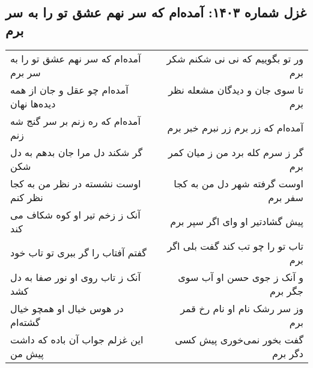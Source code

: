 \begin{center}
\section*{غزل شماره ۱۴۰۳: آمده‌ام که سر نهم عشق تو را به سر برم}
\label{sec:1403}
\begin{longtable}{l p{0.5cm} r}
آمده‌ام که سر نهم عشق تو را به سر برم
&&
ور تو بگوییم که نی نی شکنم شکر برم
\\
آمده‌ام چو عقل و جان از همه دیده‌ها نهان
&&
تا سوی جان و دیدگان مشعله نظر برم
\\
آمده‌ام که ره زنم بر سر گنج شه زنم
&&
آمده‌ام که زر برم زر نبرم خبر برم
\\
گر شکند دل مرا جان بدهم به دل شکن
&&
گر ز سرم کله برد من ز میان کمر برم
\\
اوست نشسته در نظر من به کجا نظر کنم
&&
اوست گرفته شهر دل من به کجا سفر برم
\\
آنک ز زخم تیر او کوه شکاف می کند
&&
پیش گشادتیر او وای اگر سپر برم
\\
گفتم آفتاب را گر ببری تو تاب خود
&&
تاب تو را چو تب کند گفت بلی اگر برم
\\
آنک ز تاب روی او نور صفا به دل کشد
&&
و آنک ز جوی حسن او آب سوی جگر برم
\\
در هوس خیال او همچو خیال گشته‌ام
&&
وز سر رشک نام او نام رخ قمر برم
\\
این غزلم جواب آن باده که داشت پیش من
&&
گفت بخور نمی‌خوری پیش کسی دگر برم
\\
\end{longtable}
\end{center}
